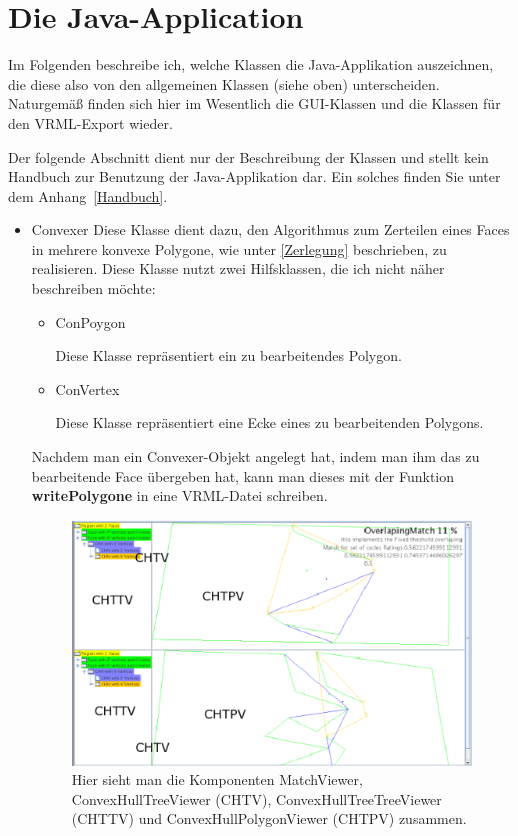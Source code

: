 \section{Die Java-Application }
Im Folgenden  beschreibe ich, welche Klassen die Java-Applikation auszeichnen, die diese also von den allgemeinen Klassen (siehe oben) unterscheiden. Naturgemäß finden sich hier im Wesentlich die GUI-Klassen und die Klassen für den VRML-Export wieder.

Der folgende Abschnitt dient nur der Beschreibung der Klassen und stellt kein Handbuch zur Benutzung der Java-Applikation dar. Ein solches finden Sie unter dem Anhang~\ref{Handbuch}.

\begin{itemize}
\item Convexer
Diese Klasse dient dazu, den Algorithmus zum Zerteilen eines Faces in mehrere konvexe Polygone, wie unter \ref{Zerlegung} beschrieben, zu realisieren. Diese Klasse nutzt zwei Hilfsklassen, die ich nicht näher beschreiben möchte:
\begin{itemize}

\item ConPoygon

Diese Klasse repräsentiert ein zu bearbeitendes Polygon.
\item ConVertex

Diese Klasse repräsentiert eine Ecke eines zu bearbeitenden Polygons.
\end{itemize}

Nachdem man ein Convexer-Objekt angelegt hat, indem man ihm das zu bearbeitende Face übergeben hat, kann man dieses mit der Funktion \textbf{writePolygone} in eine VRML-Datei schreiben.

\begin{figure}
	\centering
	\includegraphics[scale=0.8]{MatchViewer.eps}
	\caption[Ein MatchViewer mit allen Unteklassen] {Hier sieht man die Komponenten MatchViewer, ConvexHullTreeViewer (CHTV), ConvexHullTreeTreeViewer (CHTTV) und ConvexHullPolygonViewer (CHTPV) zusammen.}
	\label{fig:MatchViewer}
\end{figure}


\end{itemize}
